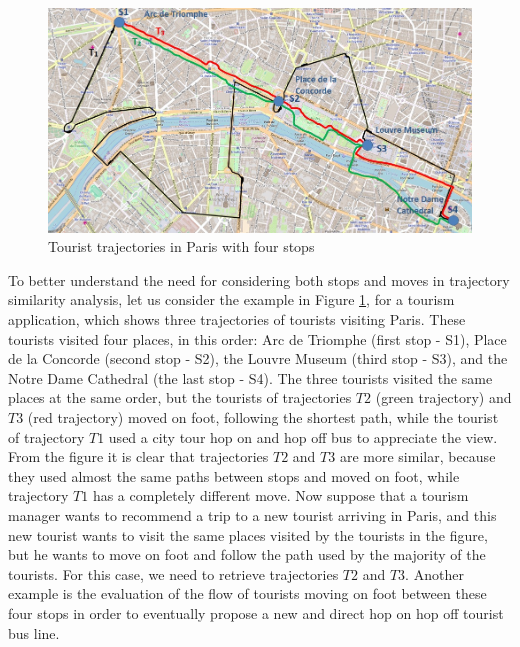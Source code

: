 \documentclass[12pt]{article}
\begin{document}
\begin{figure}[h]
\label{fig:Paris}
\centering
\includegraphics[width=1.0\textwidth]{Images/paris5.jpg}
\caption{Tourist trajectories in Paris with four stops}
\end{figure}


{To better understand the need for considering both stops and moves in trajectory similarity analysis, let us consider the example in Figure {\ref{fig:Paris}}, for a tourism application, which shows three trajectories of tourists visiting Paris. These tourists visited four places, in this order:  Arc de Triomphe (first stop - S1), Place de la Concorde (second stop - S2), the Louvre Museum (third stop - S3), and the Notre Dame Cathedral (the last stop - S4). The three tourists visited the same places at the same order, but the tourists of trajectories $T2$ (green trajectory) and $T3$ (red trajectory) moved on foot, following the shortest path, while the tourist of trajectory $T1$ used a city tour hop on and hop off bus to appreciate the view. From the figure it is clear that trajectories $T2$ and $T3$ are more similar, because they used almost the same paths between stops and moved on foot, while trajectory $T1$ has a completely different move. Now suppose that a tourism manager wants to recommend a trip to a new tourist arriving in Paris, and this new tourist wants to visit the same places visited by the tourists in the figure, but he wants to move on foot and follow the path used by the majority of the tourists.
For this case, we need to retrieve trajectories $T2$ and $T3$. 
Another example is the evaluation of the flow of tourists moving on foot between these four stops in order to eventually propose a new and direct hop on hop off tourist bus line.}
\end{document}
